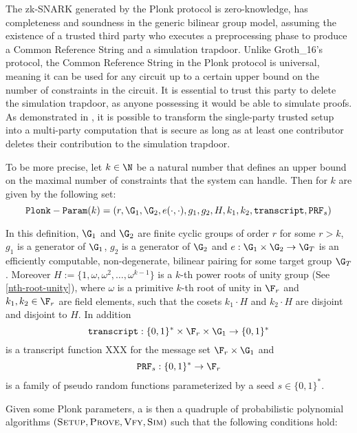 The zk-SNARK generated by the Plonk protocol is zero-knowledge, has completeness and soundness in the generic bilinear group model, assuming the existence of a trusted third party who executes a preprocessing phase to produce a Common Reference String and a simulation trapdoor. Unlike Groth\_16's protocol, the Common Reference String in the Plonk protocol is universal, meaning it can be used for any circuit up to a certain upper bound on the number of constraints in the circuit. It is essential to trust this party to delete the simulation trapdoor, as anyone possessing it would be able to simulate proofs. As demonstrated in \cite{bowe-17}, it is possible to transform the single-party trusted setup into a multi-party computation that is secure as long as at least one contributor deletes their contribution to the simulation trapdoor. 

To be more precise, let $k\in \N$ be a natural number that defines an upper bound on the maximal number of constraints that the system can handle. Then  for $k$ are given by the following set:
\begin{equation}
\label{plonk-parameters}
\mathtt{Plonk-Param}(k)=(r, \G_1, \G_2, e(\cdot,\cdot), g_1,g_2, H, k_1,k_2, \mathtt{transcript},\mathtt{PRF}_s)
\end{equation}

In this definition, $\G_1$ and $\G_2$ are finite cyclic groups of order $r$ for some $r> k$, $g_1$ is a generator of $\G_1$, $g_2$ is a generator of $\G_2$ and $e: \G_1 \times \G_2 \to \G_T$ is an efficiently computable, non-degenerate, bilinear pairing for some target group $\G_T$. Moreover $H:=\{1,\omega,\omega^2,\ldots, \omega^{k-1}\}$ is a $k$-th power roots of unity group (See \ref{nth-root-unity}), where $\omega$ is a primitive $k$-th root of unity in $\F_r$ and $k_1, k_2\in \F_r$ are field elements, such that the cosets $k_1\cdot H$ and $k_2\cdot H$ are disjoint and disjoint to $H$. In addition 
\begin{equation}
\mathtt{transcript}: \{0,1\}^* \times \F_r \times \G_1 \to \{0,1\}^* 
\end{equation}
is a transcript function XXX for the message set $\F_r \times \G_1$ and 
\begin{equation}
\mathtt{PRF}_s : \{0,1\}^* \to \F_r
\end{equation} is a family of pseudo random functions parameterized by a seed $s\in \{0,1\}^*$.


Given some Plonk parameters, a  is then a quadruple of probabilistic polynomial algorithms $(\textsc{Setup},\textsc{Prove},\textsc{Vfy},\textsc{Sim})$ such that the following conditions hold:


